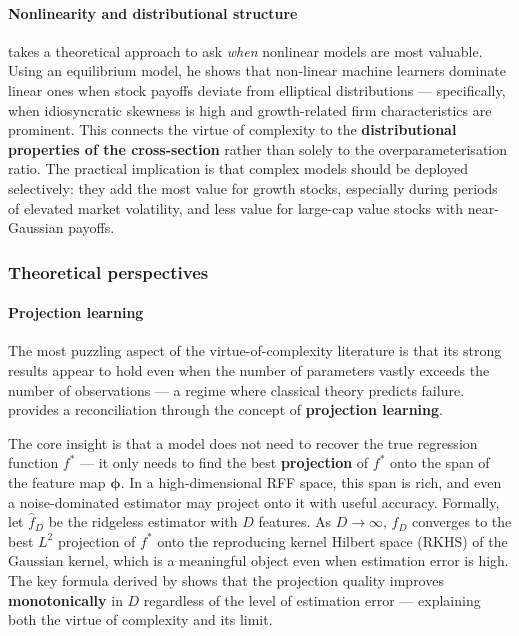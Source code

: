 \paragraph{Nonlinearity and distributional structure}

\cite{huang2025beyond} takes a theoretical approach to ask \textit{when} nonlinear models are most valuable. Using an equilibrium model, he shows that non-linear machine learners dominate linear ones when stock payoffs deviate from elliptical distributions --- specifically, when idiosyncratic skewness is high and growth-related firm characteristics are prominent. This connects the virtue of complexity to the \textbf{distributional properties of the cross-section} rather than solely to the overparameterisation ratio. The practical implication is that complex models should be deployed selectively: they add the most value for growth stocks, especially during periods of elevated market volatility, and less value for large-cap value stocks with near-Gaussian payoffs.

\subsubsection{Theoretical perspectives}\label{sec_comp_theory}

\paragraph{Projection learning}

The most puzzling aspect of the virtue-of-complexity literature is that its strong results appear to hold even when the number of parameters vastly exceeds the number of observations --- a regime where classical theory predicts failure. \cite{fallahgoul2025learning} provides a reconciliation through the concept of \textbf{projection learning}.

The core insight is that a model does not need to recover the true regression function $f^*$ --- it only needs to find the best \textbf{projection} of $f^*$ onto the span of the feature map $\boldsymbol{\phi}$. In a high-dimensional RFF space, this span is rich, and even a noise-dominated estimator may project onto it with useful accuracy. Formally, let $\hat{f}_D$ be the ridgeless estimator with $D$ features. As $D \to \infty$, $\hat{f}_D$ converges to the best $L^2$ projection of $f^*$ onto the reproducing kernel Hilbert space (RKHS) of the Gaussian kernel, which is a meaningful object even when estimation error is high. The key formula derived by \cite{fallahgoul2025learning} shows that the projection quality improves \textbf{monotonically} in $D$ regardless of the level of estimation error --- explaining both the virtue of complexity and its limit.

